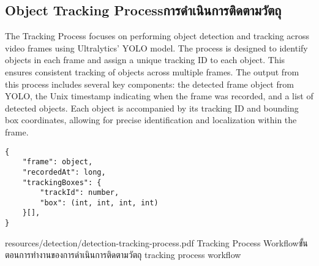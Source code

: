\subsection{\ifenglish Object Tracking Process\else การดำเนินการติดตามวัตถุ\fi}
The Tracking Process focuses on performing object detection and tracking across video frames using Ultralytics' YOLO model. The process is designed to identify objects in each frame and assign a unique tracking ID to each object. This ensures consistent tracking of objects across multiple frames. The output from this process includes several key components: the detected frame object from YOLO, the Unix timestamp indicating when the frame was recorded, and a list of detected objects. Each object is accompanied by its tracking ID and bounding box coordinates, allowing for precise identification and localization within the frame.
\begin{lstlisting}
{
    "frame": object,
    "recordedAt": long,
    "trackingBoxes": {
        "trackId": number, 
        "box": (int, int, int, int) 
    }[],
}
\end{lstlisting}

\insertPDFfigure
{resources/detection/detection-tracking-process.pdf}
{\ifenglish Tracking Process Workflow\else ขั้นตอนการทำงานของการดำเนินการติดตามวัตถุ\fi}
{tracking process workflow}